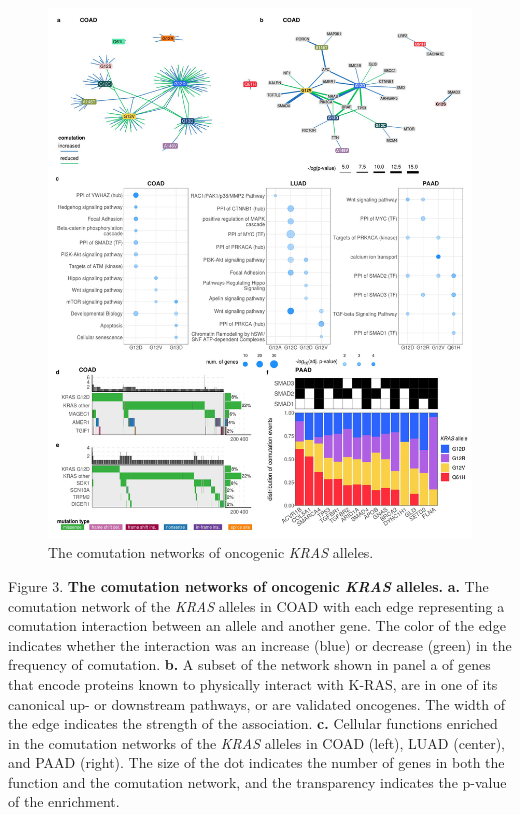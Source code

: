 \documentclass[english, 10pt, letterpaper]{article}
\newcommand{\KRAS}{\emph{KRAS}}
\newcommand{\kras}{K-RAS}
\begin{document}
\begin{figure}[h!]
\centering
\includegraphics[width=176mm]{figures/Fig_3.jpeg}
\caption{The comutation networks of oncogenic \KRAS{} alleles.}
\label{fig:comutation-main}
\end{figure}
\newpage
\noindent Figure 3. \textbf{The comutation networks of oncogenic \KRAS{} alleles.}
\textbf{a.} The comutation network of the \KRAS{} alleles in COAD with each edge representing a comutation interaction between an allele and another gene. The color of the edge indicates whether the interaction was an increase (blue) or decrease (green) in the frequency of comutation.
\textbf{b.} A subset of the network shown in panel a of genes that encode proteins known to physically interact with \kras{}, are in one of its canonical up- or downstream pathways, or are validated oncogenes. The width of the edge indicates the strength of the association.
\textbf{c.} Cellular functions enriched in the comutation networks of the \KRAS{} alleles in COAD (left), LUAD (center), and PAAD (right). The size of the dot indicates the number of genes in both the function and the comutation network, and the transparency indicates the p-value of the enrichment.
\end{document}
